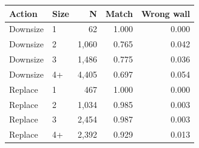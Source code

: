 \begin{tabular}{llrrr}
\toprule
Action & Size & N & Match & Wrong wall \\
\midrule
Downsize & 1 &    62 & 1.000 & 0.000 \\
Downsize & 2 & 1,060 & 0.765 & 0.042 \\
Downsize & 3 & 1,486 & 0.775 & 0.036 \\
Downsize & 4+ & 4,405 & 0.697 & 0.054 \\
Replace & 1 &   467 & 1.000 & 0.000 \\
Replace & 2 & 1,034 & 0.985 & 0.003 \\
Replace & 3 & 2,454 & 0.987 & 0.003 \\
Replace & 4+ & 2,392 & 0.929 & 0.013 \\
\bottomrule
\end{tabular}
